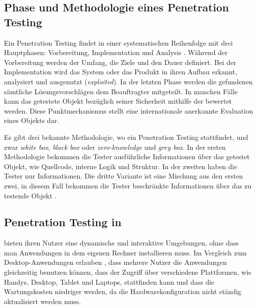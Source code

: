 \subsection{Phase und Methodologie eines Penetration Testing}

Ein Penetration Testing findet in einer systematischen Reihenfolge mit drei Hauptphasen: Vorbereitung, Implementation und Analysis \cite{Hessa_study_pentesting}. Während der Vorbereitung werden der Umfang, die Ziele und den Dauer definiert. Bei der Implementation wird das System oder das Produkt in ihren Aufbau erkannt, analysiert und ausgenutzt (\textit{exploited}). In der letzten Phase werden die gefundenen  sämtliche Lösungsvorschlägen dem Beauftragter mitgeteilt. In manchen Fälle kann das getestete Objekt bezüglich seiner Sicherheit mithilfe der  bewertet werden. Diese Punktmechanismus stellt eine internationale anerkannte Evaluation eines Objekts dar. 

Es gibt drei bekannte Methodologie, wo ein Penetration Testing stattfindet, und zwar \textit{white box}, \textit{black box} oder \textit{zero-knowledge} und \textit{grey box}. In der ersten Methodologie bekommen die Tester ausführliche Informationen über das getestet Objekt, wie Quellcode, interne Logik und Struktur. In der zweiten haben die Tester nur  Informationen. Die dritte Variante ist eine Mischung aus den ersten zwei, in diesem Fall bekommen die Tester beschränkte Informationen über das zu testende Objekt \cite{Ehmer_methoden_testen}.




\subsection{Penetration Testing in }

 bieten ihren Nutzer eine dynamische und interaktive Umgebungen, ohne dass man Anwendungen in dem eigenen Rechner installieren muss. Im Vergleich zum Desktop-Anwendungen erlauben , dass mehrere Nutzer die Anwendungen gleichzeitig benutzen können, dass der Zugriff über verschiedene Plattformen, wie Handys, Desktop, Tablet und Laptops, stattfinden kann und dass die Wartungskosten niedriger werden, da die Hardwarekonfiguration nicht ständig aktualisiert werden muss\cite{webapp}. 

